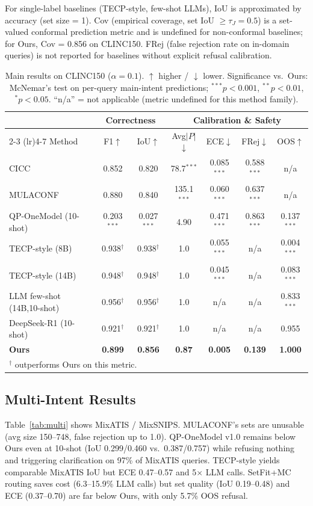\documentclass[sigconf, anonymous, review]{acmart}
\begin{document}
For single-label baselines (TECP-style, few-shot LLMs), IoU is approximated by accuracy (set size = 1). Cov (empirical coverage, set IoU $\ge \tau_J=0.5$) is a set-valued conformal prediction metric and is undefined for non-conformal baselines; for Ours, Cov = 0.856 on CLINC150. FRej (false rejection rate on in-domain queries) is not reported for baselines without explicit refusal calibration.

\begin{table}[t]
\centering\small\setlength{\tabcolsep}{4pt}
\caption{Main results on CLINC150 ($\alpha=0.1$). $\uparrow$ higher / $\downarrow$ lower. Significance vs.\ Ours: McNemar's test on per-query main-intent predictions; $^{***}p{<}0.001$, $^{**}p{<}0.01$, $^{*}p{<}0.05$. ``n/a'' = not applicable (metric undefined for this method family).}
\label{tab:clinc}
\begin{tabular}{lcccccc}
\toprule
& \multicolumn{2}{c}{Correctness} & \multicolumn{4}{c}{Calibration \& Safety} \\
\cmidrule(lr){2-3} \cmidrule(lr){4-7}
Method & F1$\uparrow$ & IoU$\uparrow$ & Avg$|P|$$\downarrow$ & ECE$\downarrow$ & FRej$\downarrow$ & OOS$\uparrow$ \\
\midrule
CICC & 0.852 & 0.820 & 78.7$^{***}$ & 0.085$^{***}$ & 0.588$^{***}$ & n/a \\
MULACONF & 0.880 & 0.840 & 135.1$^{***}$ & 0.060$^{***}$ & 0.637$^{***}$ & n/a \\
QP-OneModel (10-shot) & 0.203$^{***}$ & 0.027$^{***}$ & 4.90 & 0.471$^{***}$ & 0.863$^{***}$ & 0.137$^{***}$ \\
TECP-style (8B) & 0.938$^{\dagger}$ & 0.938$^{\dagger}$ & 1.0 & 0.055$^{***}$ & n/a & 0.004$^{***}$ \\
TECP-style (14B) & 0.948$^{\dagger}$ & 0.948$^{\dagger}$ & 1.0 & 0.045$^{***}$ & n/a & 0.083$^{***}$ \\
LLM few-shot (14B,10-shot) & 0.956$^{\dagger}$ & 0.956$^{\dagger}$ & 1.0 & n/a & n/a & 0.833$^{***}$ \\
DeepSeek-R1 (10-shot) & 0.921$^{\dagger}$ & 0.921$^{\dagger}$ & 1.0 & n/a & n/a & 0.955 \\
\textbf{Ours} & \textbf{0.899} & \textbf{0.856} & \textbf{0.87} & \textbf{0.005} & \textbf{0.139} & \textbf{1.000} \\
\bottomrule
\multicolumn{7}{l}{\footnotesize $^{\dagger}$ outperforms Ours on this metric.}
\end{tabular}
\end{table}

\subsection{Multi-Intent Results}
Table~\ref{tab:multi} shows MixATIS / MixSNIPS. MULACONF's sets are unusable (avg size 150--748, false rejection up to 1.0). QP-OneModel v1.0 remains below Ours even at 10-shot (IoU 0.299/0.460 vs.\ 0.387/0.757) while refusing nothing and triggering clarification on 97\% of MixATIS queries. TECP-style yields comparable MixATIS IoU but ECE 0.47--0.57 and 5$\times$ LLM calls. SetFit+MC routing saves cost (6.3--15.9\% LLM calls) but set quality (IoU 0.19--0.48) and ECE (0.37--0.70) are far below Ours, with only 5.7\% OOS refusal.
\end{document}
